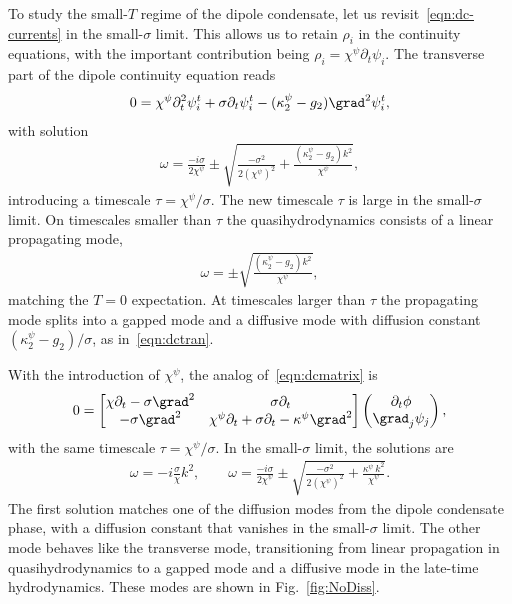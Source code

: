 To study the small-$T$ regime of the dipole condensate, let us revisit~\eqref{eqn:dc-currents} in the small-$\sigma$ limit. This allows us to retain $\rho_i$ in the continuity equations, with the important contribution being $\rho_i = \chi^\psi \partial_t\psi_i$. The transverse part of the dipole continuity equation reads
\begin{align}
0 = \chi^\psi \partial_t^2 \psi_i^t + \sigma \partial_t \psi_i^t - (\kappa^\psi_2-g_2) \grad^2 \psi_i^t,
\end{align}
with solution
\begin{align}
\omega = \frac{-i\sigma}{2\chi^\psi} \pm \sqrt{\frac{-\sigma^2}{2(\chi^\psi)^2} + \frac{(\kappa_2^\psi - g_2)k^2}{\chi^\psi}},
\end{align}
introducing a timescale $\tau = \chi^\psi/\sigma$. The new timescale $\tau$ is large in the small-$\sigma$ limit. On timescales smaller than $\tau$ the quasihydrodynamics consists of a linear propagating mode,
\begin{align}
\omega = \pm \sqrt{\frac{(\kappa_2^\psi - g_2)k^2}{\chi^\psi}},
\end{align}
matching the $T=0$ expectation. At timescales larger than $\tau$ the propagating mode splits into a gapped mode and a diffusive mode with diffusion constant $(\kappa_2^\psi - g_2)/\sigma$, as in~\eqref{eqn:dctran}.

With the introduction of $\chi^\psi$, the analog of~\ref{eqn:dcmatrix} is 
\begin{align}
0 = 
\begin{bmatrix} \chi \partial_t - \sigma \grad^2 & \sigma \partial_t  \\
-\sigma \grad^2  & \chi^\psi \partial_t + \sigma\partial_t - \kappa^\psi \grad^2
\end{bmatrix} \begin{pmatrix} \partial_t \phi \\ \grad_j\psi_j \end{pmatrix},
\end{align}
with the same timescale $\tau = \chi^\psi/\sigma$. In the small-$\sigma$ limit, the solutions are 
\begin{align}
\omega = -i\frac{\sigma}{\chi}k^2,\qquad \omega  = \frac{-i\sigma}{2\chi^\psi} \pm \sqrt{\frac{-\sigma^2}{2(\chi^\psi)^2} + \frac{\kappa^\psi\,k^2}{\chi^\psi}}.
\end{align}
The first solution matches one of the diffusion modes from the dipole condensate phase, with a diffusion constant that vanishes in the small-$\sigma$ limit. The other mode behaves like the transverse mode, transitioning from linear propagation in quasihydrodynamics to a gapped mode and a diffusive mode in the late-time hydrodynamics. These modes are shown in Fig.~\ref{fig:NoDiss}.

